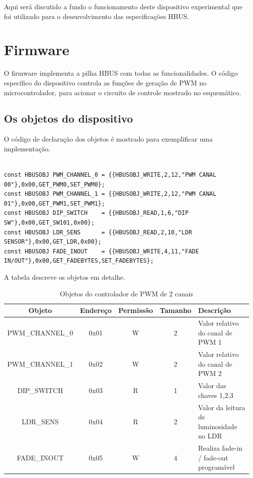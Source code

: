 \documentclass[11pt]{report}
\begin{document}
Aqui será discutido a fundo o funcionamento deste dispositivo experimental que foi utilizado para o desenvolvimento das especificações HBUS.

\section{Firmware}

O firmware implementa a pilha HBUS com todas as funcionalidades. O código específico do dispositivo controla as funções de geração de PWM no microcontrolador, para acionar o circuito de controle mostrado no esquemático.

\subsection{Os objetos do dispositivo}

O código de declaração dos objetos é mostrado para exemplificar uma implementação.

\begin{verbatim}

const HBUSOBJ PWM_CHANNEL_0 = {{HBUSOBJ_WRITE,2,12,"PWM CANAL 00"},0x00,GET_PWM0,SET_PWM0};
const HBUSOBJ PWM_CHANNEL_1 = {{HBUSOBJ_WRITE,2,12,"PWM CANAL 01"},0x00,GET_PWM1,SET_PWM1};
const HBUSOBJ DIP_SWITCH    = {{HBUSOBJ_READ,1,6,"DIP SW"},0x00,GET_SW101,0x00};
const HBUSOBJ LDR_SENS      = {{HBUSOBJ_READ,2,10,"LDR SENSOR"},0x00,GET_LDR,0x00};
const HBUSOBJ FADE_INOUT	= {{HBUSOBJ_WRITE,4,11,"FADE IN/OUT"},0x00,GET_FADEBYTES,SET_FADEBYTES};

\end{verbatim}

A tabela descreve os objetos em detalhe.

\begin{table}[H]
\centering
\caption{Objetos do controlador de PWM de 2 canais}
\begin{tabular}{c c c c p{6cm}}
\hline
Objeto			&	Endereço		&	Permissão	&	Tamanho	& Descrição\\
\hline
PWM\_CHANNEL\_0	&	0x01			&	W			&	2		& Valor relativo do canal de PWM 1\\
PWM\_CHANNEL\_1 &	0x02			&	W			&	2		& Valor relativo do canal de PWM 2\\
DIP\_SWITCH		&	0x03			&	R			&	1		& Valor das chaves 1,2,3\\
LDR\_SENS		&	0x04			&	R			&	2		& Valor da leitura de luminosidade no LDR\\
FADE\_INOUT		&	0x05			&	W			&	4		& Realiza fade-in / fade-out programável\\
\hline
\end{tabular}
\end{table}
\end{document}
